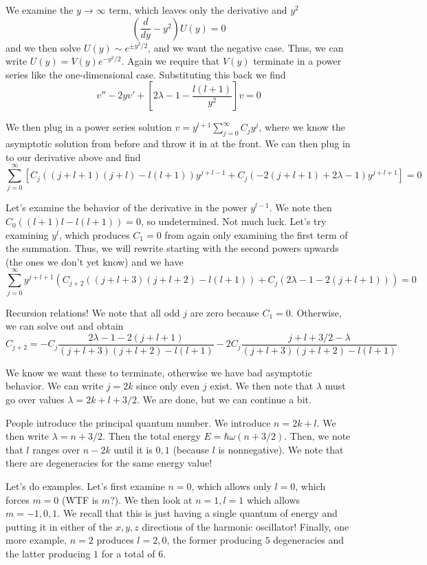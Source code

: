 \documentclass[10pt]{report}
\newcommand{\rd}[2]{\frac{d#1}{d#2}}
\begin{document}
We examine the $y \to \infty$ term, which leaves only the derivative and $y^2$
$$\left( \rd{}{y} - y^2 \right)U(y) = 0$$
and we then solve $U(y) \sim e^{\pm y^2/2}$, and we want the negative case. Thus, we can write $U(y) = V(y) e^{-y^2/2}$. Again we require that $V(y)$ terminate in a power series like the one-dimensional case. Substituting this back we find
$$v'' - 2yv' + \left[ 2\lambda - 1 - \frac{l(l+1)}{y^2} \right]v = 0$$

We then plug in a power series solution $v = y^{l+1}\sum_{j=0}^\infty C_j y^j$, where we know the asymptotic solution from before and throw it in at the front. We can then plug in to our derivative above and find
$$\sum_{j=0}^\infty \left[ C_j\left( (j+l+1)(j+l) - l(l+1) \right)y^{j+l-1} + C_j\left( -2(j+l+1) + 2\lambda - 1 \right)y^{j+l+1} \right] = 0$$

Let's examine the behavior of the derivative in the power $y^{l-1}$. We note then $C_0\left( (l+1)l - l(l+1) \right) = 0$, so undetermined. Not much luck. Let's try examining $y^l$, which produces $C_1 = 0$ from again only examining the first term of the summation. Thus, we will rewrite starting with the second powers upwards (the ones we don't yet know) and we have
$$\sum_{j=0}^\infty y^{j+l+1}\left( C_{j+2}\left( (j+l+3)(j+l+2) - l(l+1) \right) + C_j(2\lambda-1-2(j+l+1)) \right) = 0$$

Recursion relations! We note that all odd $j$ are zero because $C_1 = 0$. Otherwise, we can solve out and obtain
$$C_{j+2} = -C_j\frac{2\lambda - 1 - 2(j+l+1)}{(j+l+3)(j+l+2) - l(l+1)} - 2C_j\frac{j + l + 3/2 - \lambda}{(j+l+3)(j+l+2) - l(l+1)}$$

We know we want these to terminate, otherwise we have bad asymptotic behavior. We can write $j = 2k$ since only even $j$ exist. We then note that $\lambda$ must go over values $\lambda = 2k + l + 3/2$. We are done, but we can continue a bit.

People introduce the principal quantum number. We introduce $n = 2k + l$. We then write $\lambda = n + 3/2$. Then the total energy $E = \hbar \omega(n+3/2)$. Then, we note that $l$ ranges over $n-2k$ until it is $0,1$ (because $l$ is nonnegative). We note that there are degeneracies for the same energy value!

Let's do examples. Let's first examine $n=0$, which allows only $l = 0$, which forces $m=0$ (WTF is $m$?). We then look at $n=1, l=1$ which allows $m=-1,0,1$. We recall that this is just having a single quantum of energy and putting it in either of the $x,y,z$ directions of the harmonic oscillator! Finally, one more example, $n=2$ produces $l=2,0$, the former producing $5$ degeneracies and the latter producing $1$ for a total of $6$.
\end{document}
